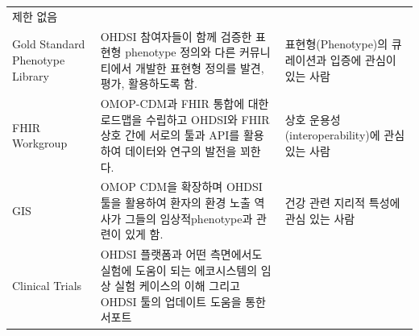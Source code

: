 \documentclass[11pt]{book}
\theoremstyle{definition}
\theoremstyle{definition}
\theoremstyle{definition}
\theoremstyle{remark}
\begin{document}
\begin{longtable}[]{@{}lll@{}}
\begin{minipage}[t]{0.37\columnwidth}
제한 없음\strut
\end{minipage}\tabularnewline
\begin{minipage}[t]{0.11\columnwidth}\raggedright\strut
Gold Standard Phenotype Library\strut
\end{minipage} & \begin{minipage}[t]{0.44\columnwidth}\raggedright\strut
OHDSI 참여자들이 함께 검증한 표현형 phenotype 정의와 다른 커뮤니티에서
개발한 표현형 정의를 발견, 평가, 활용하도록 함.\strut
\end{minipage} & \begin{minipage}[t]{0.37\columnwidth}\raggedright\strut
표현형(Phenotype)의 큐레이션과 입증에 관심이 있는 사람\strut
\end{minipage}\tabularnewline
\begin{minipage}[t]{0.11\columnwidth}\raggedright\strut
FHIR Workgroup\strut
\end{minipage} & \begin{minipage}[t]{0.44\columnwidth}\raggedright\strut
OMOP-CDM과 FHIR 통합에 대한 로드맵을 수립하고 OHDSI와 FHIR 상호 간에
서로의 툴과 API를 활용하여 데이터와 연구의 발전을 꾀한다.\strut
\end{minipage} & \begin{minipage}[t]{0.37\columnwidth}\raggedright\strut
상호 운용성(interoperability)에 관심 있는 사람\strut
\end{minipage}\tabularnewline
\begin{minipage}[t]{0.11\columnwidth}\raggedright\strut
GIS\strut
\end{minipage} & \begin{minipage}[t]{0.44\columnwidth}\raggedright\strut
OMOP CDM을 확장하며 OHDSI 툴을 활용하여 환자의 환경 노출 역사가 그들의
임상적phenotype과 관련이 있게 함.\strut
\end{minipage} & \begin{minipage}[t]{0.37\columnwidth}\raggedright\strut
건강 관련 지리적 특성에 관심 있는 사람\strut
\end{minipage}\tabularnewline
\begin{minipage}[t]{0.11\columnwidth}\raggedright\strut
Clinical Trials\strut
\end{minipage} & \begin{minipage}[t]{0.44\columnwidth}\raggedright\strut
OHDSI 플랫폼과 어떤 측면에서도 실험에 도움이 되는 에코시스템의 임상 실험
케이스의 이해 그리고 OHDSI 툴의 업데이트 도움을 통한 서포트\strut
\end{minipage} & \begin{minipage}[t]{0.37\columnwidth}\raggedright\strut

\end{minipage}
\end{longtable}
\end{document}
